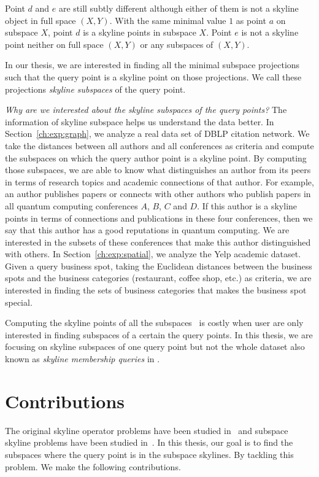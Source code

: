 Point $d$ and $e$ are still subtly different although either of them is not a skyline object in full space $(X, Y)$. With the same minimal value $1$ as point $a$ on subspace $X$, point $d$ is a skyline points in subspace $X$. Point $e$ is not a skyline point neither on full space $(X, Y)$ or any subspaces of $(X, Y)$.

In our thesis, we are interested in finding all the minimal subspace projections such that the query point is a skyline point on those projections. We call these projections \emph{skyline subspaces} of the query point.

\emph{Why are we interested about the skyline subspaces of the query points?} The information of skyline subspace helps us understand the data better. In Section~\ref{ch:exp:graph}, we analyze a real data set of DBLP citation network. We take the distances between all authors and all conferences as criteria and compute the subspaces on which the query author point is a skyline point. By computing those subspaces, we are able to know what distinguishes an author from its peers in terms of research topics and academic connections of that author. For example, an author publishes papers or connects with other authors who publish papers in all quantum computing conferences $A$, $B$, $C$ and $D$. If this author is a skyline points in terms of connections and publications in these four conferences, then we say that this author has a good reputations in quantum computing. We are interested in the subsets of these conferences that make this author distinguished with others. In Section~\ref{ch:exp:spatial}, we analyze the Yelp academic dataset. Given a query business spot, taking the Euclidean distances between the business spots and the business categories (restaurant, coffee shop, etc.) as criteria, we are interested in finding the sets of business categories that makes the business spot special.

Computing the skyline points of all the subspaces~\cite{pei2005catching, yuan2005efficient} is costly when user are only interested in finding subspaces of a certain the query points. In this thesis, we are focusing on skyline subspaces of one query point but not the whole dataset also known as \emph{skyline membership queries} in \cite{pei2005catching}.

\section{Contributions}
The original skyline operator problems have been studied in~\cite{borzsony2001skyline, chomicki2003skyline} and subspace skyline problems have been studied in~\cite{pei2005catching, yuan2005efficient}. In this thesis, our goal is to find the subspaces where the query point is in the subspace skylines. By tackling this problem. We make the following contributions.

